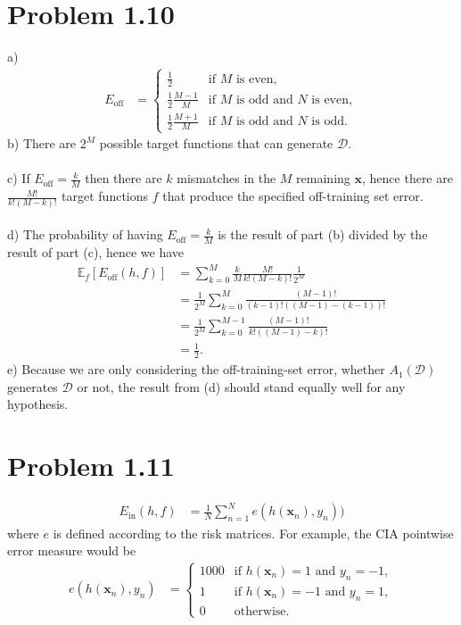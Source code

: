 \documentclass[11pt,letterpaper]{article}
\newcommand{\vv}[1]{\mathbf{#1}} %
\newcommand{\e}[0]{\mathbb{E}}
\begin{document}
\section*{Problem 1.10}

a) 
\begin{align*}
    E_\textrm{off} &= 
    \begin{cases}
        \frac{1}{2}& \text{if $M$ is even},\\
        \frac{1}{2}\frac{M - 1}{M} & \text{if $M$ is odd and $N$ is even},\\
        \frac{1}{2}\frac{M + 1}{M} & \text{if $M$ is odd and $N$ is odd}.
    \end{cases}
\end{align*}
b) There are $2^M$ possible target functions that can generate $\mathcal{D}$.
\\\\
c) If $E_\textrm{off} = \frac{k}{M}$ then there are $k$ mismatches in the $M$ remaining $\vv{x}$, hence there are $\frac{M!}{k!(M - k)!}$ target functions $f$ that produce the specified off-training set error.
\\\\
d) The probability of having $E_\textrm{off} = \frac{k}{M}$ is the result of part (b) divided by the result of part (c), hence we have
\begin{align*}
    \e_f[E_\textrm{off}(h, f)] &= \sum_{k = 0}^{M} \frac{k}{M} \frac{M!}{k!(M - k)!} \frac{1}{2^M} \\
    &= \frac{1}{2^M} \sum_{k = 0}^{M} \frac{(M - 1)!}{(k - 1)!((M - 1) - (k - 1))!}  \\
    &= \frac{1}{2^M} \sum_{k = 0}^{M - 1} \frac{(M - 1)!}{k!((M - 1) - k)!}  \\
    &= \frac{1}{2}.
\end{align*}
e) Because we are only considering the off-training-set error, whether $A_1(\mathcal{D})$ generates $\mathcal{D}$ or not, the result from (d) should stand equally well for any hypothesis.

\section*{Problem 1.11}
\begin{align*}
    E_\textrm{in}(h, f) &= \frac{1}{N} \sum_{n = 1}^N e(h(\vv{x}_n), y_n))
\end{align*}
where $e$ is defined according to the risk matrices.  For example, the CIA pointwise error measure would be
\begin{align*}
    e(h(\vv{x}_n), y_n) &=
    \begin{cases}
        1000& \textrm{if $h(\vv{x}_n) = 1$ and $y_n = -1$},\\
        1& \textrm{if $h(\vv{x}_n) = -1$ and $y_n = 1$},\\
        0& \textrm{otherwise}.
    \end{cases}
\end{align*}
\end{document}

